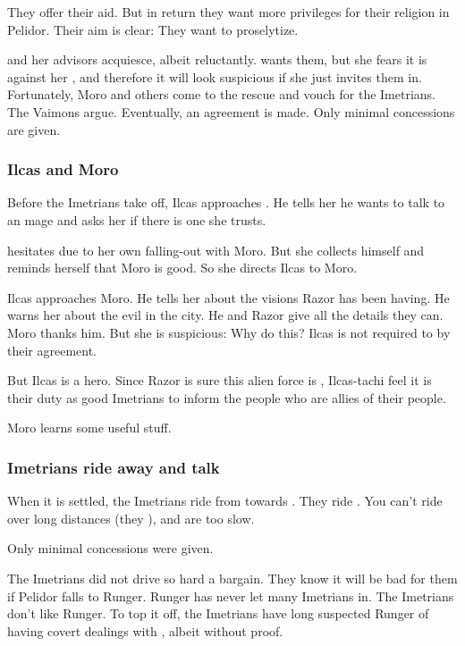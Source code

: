 They offer their aid. 
But in return they want more privileges for their religion in Pelidor. 
Their aim is clear: They want to proselytize. 

\Tiroco{} and her advisors acquiesce, albeit reluctantly. 
\Tiroco{} wants them, but she fears it is against her , and therefore it will look suspicious if she just invites them in. 
Fortunately, Moro and others come to the rescue and vouch for the Imetrians. 
The Vaimons argue. 
Eventually, an agreement is made. 
Only minimal concessions are given. 





\subsubsection{Ilcas and Moro}
Before the Imetrians take off, Ilcas approaches \Tiroco. 
He tells her he wants to talk to an \Ishrah{} mage and asks her if there is one she trusts. 

\Tiroco{} hesitates due to her own falling-out with Moro. 
But she collects himself and reminds herself that Moro is good. 
So she directs Ilcas to Moro. 

Ilcas approaches Moro. 
He tells her about the visions Razor has been having. 
He warns her about the evil in the city. 
He and Razor give all the details they can. 
Moro thanks him. 
But she is suspicious: Why do this? 
Ilcas is not required to by their agreement. 

But Ilcas is a hero. 
Since Razor is sure this alien force is , Ilcas-tachi feel it is their duty as good Imetrians to inform the people who are allies of their people. 

Moro learns some useful stuff. 





\subsubsection{Imetrians ride away and talk}
When it is settled, the Imetrians ride from \Malcur towards \Forclin. 
They ride \relcs. 
You can't ride \nycans{} over long distances (they ), and \mulgrons{} are too slow. 

Only minimal concessions were given. 

The Imetrians did not drive so hard a bargain. 
They know it will be bad for them if Pelidor falls to Runger. 
Runger has never let many Imetrians in. 
The Imetrians don't like Runger. 
To top it off, the Imetrians have long suspected Runger of having covert dealings with \Durcac, albeit without proof. 

